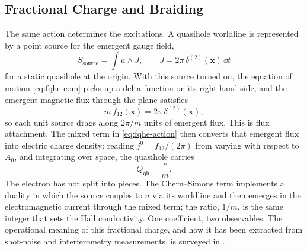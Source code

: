 \subsection{Fractional Charge and Braiding}
\label{subsec:fractional-charge-braiding}

The same action determines the excitations. A quasihole worldline is represented by a point source for the emergent gauge field,
\begin{equation}
  S_{\mathrm{source}} = \int a\wedge J,
  \qquad
  J = 2\pi\,\delta^{(2)}(\mathbf{x})\,\dd t
  \label{eq:fqhe-source}
\end{equation}
for a static quasihole at the origin. With this source turned on, the equation of motion \eqref{eq:fqhe-eom} picks up a delta function on its right-hand side, and the emergent magnetic flux through the plane satisfies
\begin{equation}
  m\,f_{12}(\mathbf{x}) = 2\pi\,\delta^{(2)}(\mathbf{x}),
  \label{eq:fqhe-flux-attachment}
\end{equation}
so each unit source drags along $2\pi/m$ units of emergent flux. This is flux attachment. The mixed term in \eqref{eq:fqhe-action} then converts that emergent flux into electric charge density: reading $j^0 = f_{12}/(2\pi)$ from varying with respect to $A_0$, and integrating over space, the quasihole carries
\begin{equation}
  Q_{\mathrm{qh}} = \frac{e}{m}.
  \label{eq:fqhe-fractional-charge}
\end{equation}
The electron has not split into pieces. The Chern--Simons term implements a duality in which the source couples to $a$ via its worldline and then emerges in the electromagnetic current through the mixed term; the ratio, $1/m$, is the same integer that sets the Hall conductivity. One coefficient, two observables. The operational meaning of this fractional charge, and how it has been extracted from shot-noise \cite{Saminadayar1997FractionalCharge,dePicciotto1997FractionalCharge} and interferometry \cite{CaminoZhouGoldman2005ABSuperperiod} measurements, is surveyed in \cite{HalperinSternNederRosenow2011FractionalCharge,Stern2008AnyonsQHEReview}.

